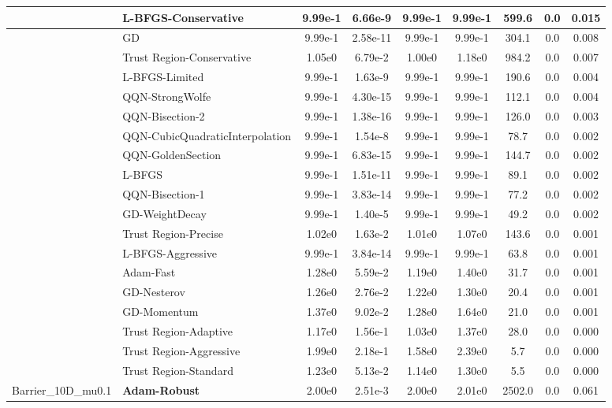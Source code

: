\documentclass[10pt]{article}
\begin{document}
\begin{longtable}{|l|l|c|c|c|c|c|c|c|}
\hline
 & L-BFGS-Conservative & 9.99e-1 & 6.66e-9 & 9.99e-1 & 9.99e-1 & 599.6 & 0.0 & 0.015 \\
\hline
 & GD & 9.99e-1 & 2.58e-11 & 9.99e-1 & 9.99e-1 & 304.1 & 0.0 & 0.008 \\
\hline
 & Trust Region-Conservative & 1.05e0 & 6.79e-2 & 1.00e0 & 1.18e0 & 984.2 & 0.0 & 0.007 \\
\hline
 & L-BFGS-Limited & 9.99e-1 & 1.63e-9 & 9.99e-1 & 9.99e-1 & 190.6 & 0.0 & 0.004 \\
\hline
 & QQN-StrongWolfe & 9.99e-1 & 4.30e-15 & 9.99e-1 & 9.99e-1 & 112.1 & 0.0 & 0.004 \\
\hline
 & QQN-Bisection-2 & 9.99e-1 & 1.38e-16 & 9.99e-1 & 9.99e-1 & 126.0 & 0.0 & 0.003 \\
\hline
 & QQN-CubicQuadraticInterpolation & 9.99e-1 & 1.54e-8 & 9.99e-1 & 9.99e-1 & 78.7 & 0.0 & 0.002 \\
\hline
 & QQN-GoldenSection & 9.99e-1 & 6.83e-15 & 9.99e-1 & 9.99e-1 & 144.7 & 0.0 & 0.002 \\
\hline
 & L-BFGS & 9.99e-1 & 1.51e-11 & 9.99e-1 & 9.99e-1 & 89.1 & 0.0 & 0.002 \\
\hline
 & QQN-Bisection-1 & 9.99e-1 & 3.83e-14 & 9.99e-1 & 9.99e-1 & 77.2 & 0.0 & 0.002 \\
\hline
 & GD-WeightDecay & 9.99e-1 & 1.40e-5 & 9.99e-1 & 9.99e-1 & 49.2 & 0.0 & 0.002 \\
\hline
 & Trust Region-Precise & 1.02e0 & 1.63e-2 & 1.01e0 & 1.07e0 & 143.6 & 0.0 & 0.001 \\
\hline
 & L-BFGS-Aggressive & 9.99e-1 & 3.84e-14 & 9.99e-1 & 9.99e-1 & 63.8 & 0.0 & 0.001 \\
\hline
 & Adam-Fast & 1.28e0 & 5.59e-2 & 1.19e0 & 1.40e0 & 31.7 & 0.0 & 0.001 \\
\hline
 & GD-Nesterov & 1.26e0 & 2.76e-2 & 1.22e0 & 1.30e0 & 20.4 & 0.0 & 0.001 \\
\hline
 & GD-Momentum & 1.37e0 & 9.02e-2 & 1.28e0 & 1.64e0 & 21.0 & 0.0 & 0.001 \\
\hline
 & Trust Region-Adaptive & 1.17e0 & 1.56e-1 & 1.03e0 & 1.37e0 & 28.0 & 0.0 & 0.000 \\
\hline
 & Trust Region-Aggressive & 1.99e0 & 2.18e-1 & 1.58e0 & 2.39e0 & 5.7 & 0.0 & 0.000 \\
\hline
 & Trust Region-Standard & 1.23e0 & 5.13e-2 & 1.14e0 & 1.30e0 & 5.5 & 0.0 & 0.000 \\
Barrier\_10D\_mu0.1 & \textbf{Adam-Robust} & 2.00e0 & 2.51e-3 & 2.00e0 & 2.01e0 & 2502.0 & 0.0 & 0.061 \\

\end{longtable}
\end{document}
